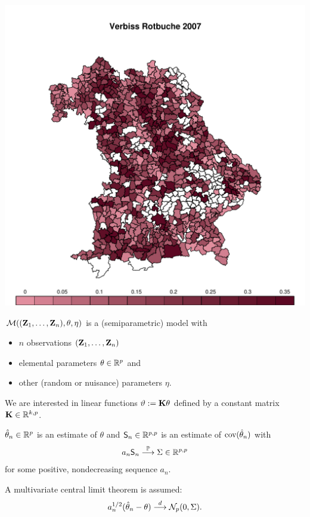 \documentclass[landscape]{slides}
\begin{document}
\begin{center}
\includegraphics[height=\textheight]{figs/rotbuche2007}
\end{center}


$\mathcal{M}((\mathbf{Z}_1, \dots, \mathbf{Z}_n), \theta, \eta)$ is a (semiparametric) model with

\begin{itemize}
\item $n$ observations $(\mathbf{Z}_1, \dots, \mathbf{Z}_n)$
\item elemental parameters $\theta \in \mathbb{R}^p$ and
\item other (random or nuisance) parameters $\eta$.
\end{itemize}

We are interested in linear functions $\vartheta := \mathbf{K} \theta$ defined
by a constant matrix $\mathbf{K} \in \mathbb{R}^{k, p}$.


$\hat{\theta}_n \in \mathbb{R}^p$ is an estimate of $\theta$ and
$\textsf{S}_n \in \mathbb{R}^{p,p}$ is an estimate of $\text{cov}(\hat{\theta}_n)$ with
\begin{eqnarray*}
a_n \textsf{S}_n \stackrel{\mathbb{P}}{\longrightarrow} \Sigma \in \mathbb{R}^{p,p}
\end{eqnarray*}
for some positive, nondecreasing sequence $a_n$.

A multivariate central limit theorem is assumed:
\begin{eqnarray*}
a_n^{1/2} (\hat{\theta}_n - \theta) \stackrel{d}{\longrightarrow} \mathcal{N}_p(0, \Sigma).
\end{eqnarray*}
\end{document}
